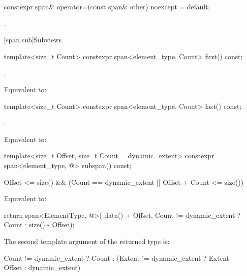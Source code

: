 %
\begin{itemdecl}
constexpr span& operator=(const span& other) noexcept = default;
\end{itemdecl}
\begin{itemdescr}
\pnum
\ensures
{}.
\end{itemdescr}

[span.sub]{Subviews}

%
\begin{itemdecl}
template<size_t Count> constexpr span<element_type, Count> first() const;
\end{itemdecl}
\begin{itemdescr}
\pnum
\requires
{}.

\pnum
\effects
Equivalent to: 
\end{itemdescr}

%
\begin{itemdecl}
template<size_t Count> constexpr span<element_type, Count> last() const;
\end{itemdecl}
\begin{itemdescr}
\pnum
\requires
{}.

\pnum
\effects
Equivalent to: 
\end{itemdescr}

%
\begin{itemdecl}
template<size_t Offset, size_t Count = dynamic_extent>
  constexpr span<element_type, @\seebelow@> subspan() const;
\end{itemdecl}
\begin{itemdescr}
\pnum
\requires
\begin{codeblock}
Offset <= size() && (Count == dynamic_extent || Offset + Count <= size())
\end{codeblock}

\pnum
\effects
Equivalent to:
\begin{codeblock}
return span<ElementType, @\seebelow@>(
  data() + Offset, Count != dynamic_extent ? Count : size() - Offset);
\end{codeblock}

\pnum
\remarks
The second template argument of the returned  type is:
\begin{codeblock}
Count != dynamic_extent ? Count
                        : (Extent != dynamic_extent ? Extent - Offset
                                                    : dynamic_extent)
\end{codeblock}
\end{itemdescr}

